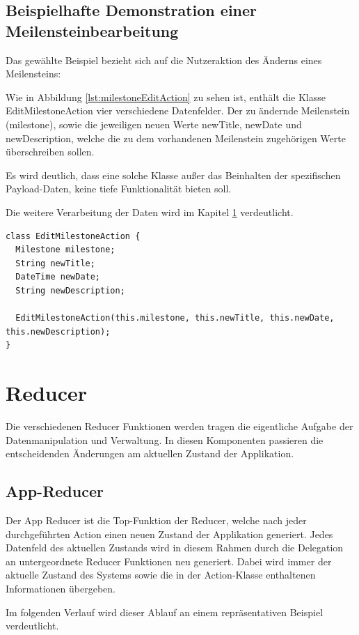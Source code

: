 \documentclass[bibliography=totoc,listof=totoc,BCOR=5mm,DIV=12,oneside]{scrbook}
\begin{document}
\subsection{Beispielhafte Demonstration einer Meilensteinbearbeitung}
\par Das gewählte Beispiel bezieht sich auf die Nutzeraktion des Änderns eines Meilensteins:

\par Wie in Abbildung \ref{lst:milestoneEditAction} zu sehen ist, enthält die Klasse EditMilestoneAction vier verschiedene Datenfelder. 
Der zu ändernde Meilenstein (milestone), sowie die jeweiligen neuen Werte newTitle, newDate und newDescription, welche die zu dem vorhandenen Meilenstein zugehörigen Werte überschreiben sollen.
\par Es wird deutlich, dass eine solche Klasse außer das Beinhalten der spezifischen Payload-Daten, keine tiefe Funktionalität bieten soll. 
\par Die weitere Verarbeitung der Daten wird im Kapitel \ref{sec:reducer} verdeutlicht.

\bigskip
\begin{lstlisting}[caption={Meilenstein Action Beispiel},captionpos=b, label=lst:milestoneEditAction]
class EditMilestoneAction {
  Milestone milestone;
  String newTitle;
  DateTime newDate;
  String newDescription;

  EditMilestoneAction(this.milestone, this.newTitle, this.newDate, this.newDescription);
}
\end{lstlisting}
\bigskip


\newpage
\section{Reducer}
\label{sec:reducer}
\par Die verschiedenen Reducer Funktionen werden tragen die eigentliche Aufgabe der Datenmanipulation und Verwaltung. In diesen Komponenten passieren die entscheidenden Änderungen am aktuellen Zustand der Applikation.

\subsection{App-Reducer}
\par Der App Reducer ist die Top-Funktion der Reducer, welche nach jeder durchgeführten Action einen neuen Zustand der Applikation generiert. Jedes Datenfeld des aktuellen Zustands wird in diesem Rahmen durch die Delegation an untergeordnete Reducer Funktionen neu generiert. Dabei wird immer der aktuelle Zustand des Systems sowie die in der Action-Klasse enthaltenen Informationen übergeben.
\par \medskip Im folgenden Verlauf wird dieser Ablauf an einem repräsentativen Beispiel verdeutlicht.
\end{document}
